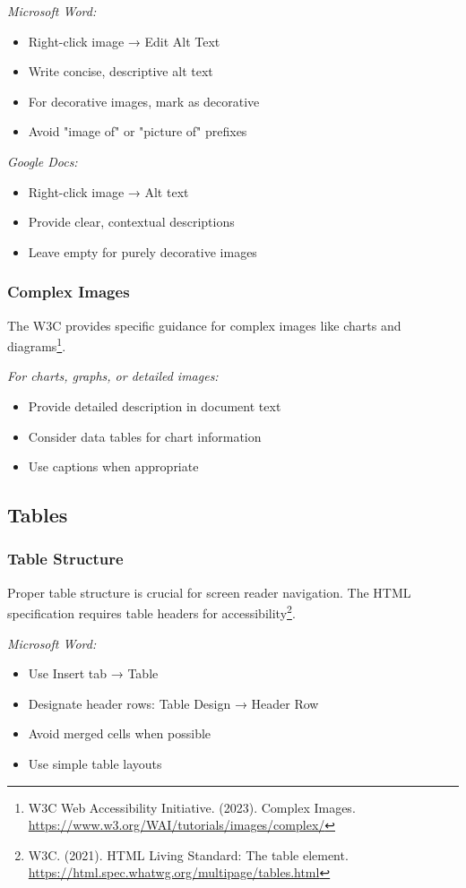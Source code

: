 \emph{Microsoft Word:}
\begin{itemize}
\item Right-click image → Edit Alt Text
\item Write concise, descriptive alt text
\item For decorative images, mark as decorative
\item Avoid "image of" or "picture of" prefixes
\end{itemize}

\emph{Google Docs:}
\begin{itemize}
\item Right-click image → Alt text
\item Provide clear, contextual descriptions
\item Leave empty for purely decorative images
\end{itemize}

\subsubsection{Complex Images}
The W3C provides specific guidance for complex images like charts and diagrams\footnote{W3C Web Accessibility Initiative. (2023). Complex Images. \url{https://www.w3.org/WAI/tutorials/images/complex/}}.

\emph{For charts, graphs, or detailed images:}
\begin{itemize}
\item Provide detailed description in document text
\item Consider data tables for chart information
\item Use captions when appropriate
\end{itemize}

\subsection{Tables}

\subsubsection{Table Structure}
Proper table structure is crucial for screen reader navigation. The HTML specification requires table headers for accessibility\footnote{W3C. (2021). HTML Living Standard: The table element. \url{https://html.spec.whatwg.org/multipage/tables.html}}.

\emph{Microsoft Word:}
\begin{itemize}
\item Use Insert tab → Table
\item Designate header rows: Table Design → Header Row
\item Avoid merged cells when possible
\item Use simple table layouts
\end{itemize}

